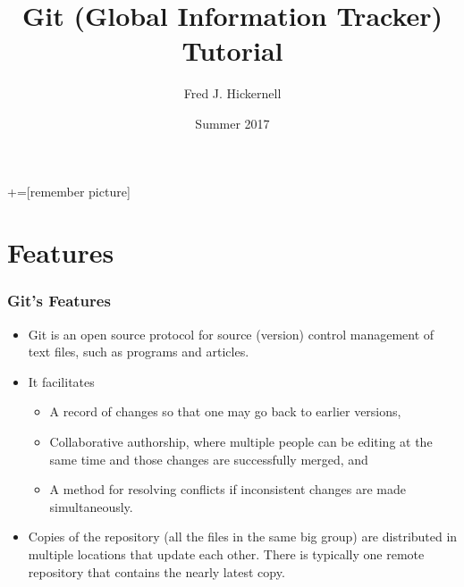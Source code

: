 \documentclass[12pt, compress,xcolor={usenames,dvipsnames}]{beamer} %
\begin{document}
	+=[remember picture]
	\everymath{\displaystyle}
	
	\title[Git Tutorial]{Git (Global Information Tracker) Tutorial}
	\author[Fred J. Hickernell]{Fred J. Hickernell}
	\date[Summer 2017]{Summer 2017}
	\frame[label=title]{\titlepage}
	
	
\section{Features}
	\begin{frame}\frametitle{Git's Features}
		
		\vspace{-3ex}
		
		\begin{itemize}
						
			\item Git is an open source protocol for \alert{source (version) control management} of text files, such as programs and articles.
			
			\item It facilitates
			
			\begin{itemize}
				\item A \alert{record of changes} so that one may go back to earlier versions,
				
				\item \alert{Collaborative} authorship, where multiple people can be editing at the same time and those changes are successfully merged, and
				
				\item A method for \alert{resolving conflicts} if inconsistent changes are made simultaneously.
			\end{itemize}
			
			\item Copies of the repository (all the files in the same big group) are \alert{distributed} in multiple locations that update each other.  There is typically one remote repository that contains the nearly latest copy.
			 
			
		\end{itemize}
		
	\end{frame}
	
\end{document}
